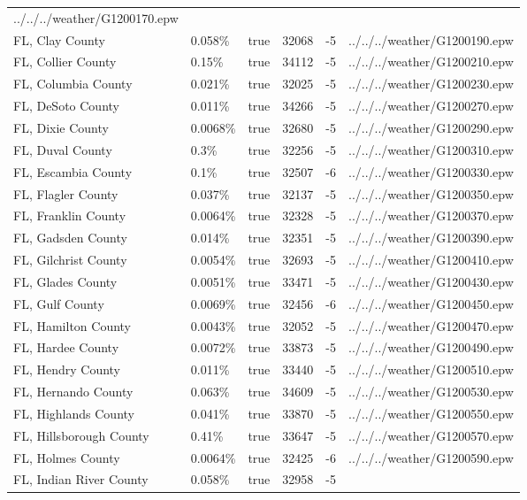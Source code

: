 \begin{longtable}[]{@{}llllll@{}}
../../../weather/G1200170.epw \\
FL, Clay County & 0.058\% & true & 32068 & -5 &
../../../weather/G1200190.epw \\
FL, Collier County & 0.15\% & true & 34112 & -5 &
../../../weather/G1200210.epw \\
FL, Columbia County & 0.021\% & true & 32025 & -5 &
../../../weather/G1200230.epw \\
FL, DeSoto County & 0.011\% & true & 34266 & -5 &
../../../weather/G1200270.epw \\
FL, Dixie County & 0.0068\% & true & 32680 & -5 &
../../../weather/G1200290.epw \\
FL, Duval County & 0.3\% & true & 32256 & -5 &
../../../weather/G1200310.epw \\
FL, Escambia County & 0.1\% & true & 32507 & -6 &
../../../weather/G1200330.epw \\
FL, Flagler County & 0.037\% & true & 32137 & -5 &
../../../weather/G1200350.epw \\
FL, Franklin County & 0.0064\% & true & 32328 & -5 &
../../../weather/G1200370.epw \\
FL, Gadsden County & 0.014\% & true & 32351 & -5 &
../../../weather/G1200390.epw \\
FL, Gilchrist County & 0.0054\% & true & 32693 & -5 &
../../../weather/G1200410.epw \\
FL, Glades County & 0.0051\% & true & 33471 & -5 &
../../../weather/G1200430.epw \\
FL, Gulf County & 0.0069\% & true & 32456 & -6 &
../../../weather/G1200450.epw \\
FL, Hamilton County & 0.0043\% & true & 32052 & -5 &
../../../weather/G1200470.epw \\
FL, Hardee County & 0.0072\% & true & 33873 & -5 &
../../../weather/G1200490.epw \\
FL, Hendry County & 0.011\% & true & 33440 & -5 &
../../../weather/G1200510.epw \\
FL, Hernando County & 0.063\% & true & 34609 & -5 &
../../../weather/G1200530.epw \\
FL, Highlands County & 0.041\% & true & 33870 & -5 &
../../../weather/G1200550.epw \\
FL, Hillsborough County & 0.41\% & true & 33647 & -5 &
../../../weather/G1200570.epw \\
FL, Holmes County & 0.0064\% & true & 32425 & -6 &
../../../weather/G1200590.epw \\
FL, Indian River County & 0.058\% & true & 32958 & -5 &

\end{longtable}
